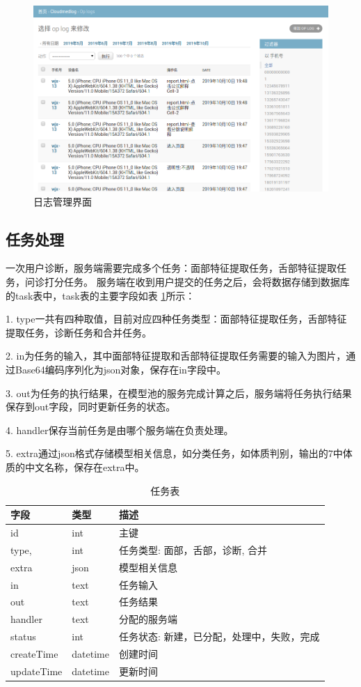 \begin{figure}[ht]
    \centering
    \includegraphics[width=15cm]{images/op_log.png}
    \caption{日志管理界面}
    \label{fig:op_log}
\end{figure}

\subsection{任务处理}
一次用户诊断，服务端需要完成多个任务：面部特征提取任务，舌部特征提取任务，问诊打分任务。
服务端在收到用户提交的任务之后，会将数据存储到数据库的task表中，task表的主要字段如表 \ref{tab:task}所示：

1. type一共有四种取值，目前对应四种任务类型：面部特征提取任务，舌部特征提取任务，诊断任务和合并任务。

2. in为任务的输入，其中面部特征提取和舌部特征提取任务需要的输入为图片，通过Base64编码序列化为json对象，保存在in字段中。

3. out为任务的执行结果，在模型池的服务完成计算之后，服务端将任务执行结果保存到out字段，同时更新任务的状态。

4. handler保存当前任务是由哪个服务端在负责处理。

5. extra通过json格式存储模型相关信息，如分类任务，如体质判别，输出的7中体质的中文名称，保存在extra中。

\begin{table}[]
    \centering
    \begin{tabular}{lll}
        \toprule
        字段 & 类型 & 描述 \\ 
        \midrule
        id & int & 主键 \\
        type, & int & 任务类型: 面部，舌部，诊断, 合并 \\ 
        extra & json & 模型相关信息 \\
        in & text & 任务输入 \\
        out & text & 任务结果 \\
        handler & text & 分配的服务端 \\
        status & int & 任务状态: 新建，已分配，处理中，失败，完成 \\
        createTime & datetime & 创建时间 \\
        updateTime & datetime & 更新时间\\
        \bottomrule
    \end{tabular}
    \caption{任务表}
    \label{tab:task}
\end{table}

